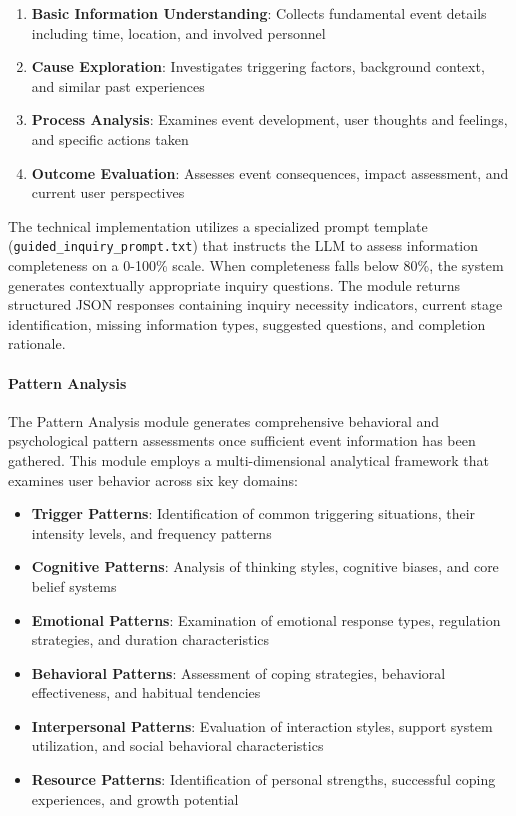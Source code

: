 \begin{enumerate}
\item \textbf{Basic Information Understanding}: Collects fundamental event details including time, location, and involved personnel
\item \textbf{Cause Exploration}: Investigates triggering factors, background context, and similar past experiences
\item \textbf{Process Analysis}: Examines event development, user thoughts and feelings, and specific actions taken
\item \textbf{Outcome Evaluation}: Assesses event consequences, impact assessment, and current user perspectives
\end{enumerate}

The technical implementation utilizes a specialized prompt template (\texttt{guided\_inquiry\_prompt.txt}) that instructs the LLM to assess information completeness on a 0-100\% scale. When completeness falls below 80\%, the system generates contextually appropriate inquiry questions. The module returns structured JSON responses containing inquiry necessity indicators, current stage identification, missing information types, suggested questions, and completion rationale.

\paragraph{Pattern Analysis}

The Pattern Analysis module generates comprehensive behavioral and psychological pattern assessments once sufficient event information has been gathered. This module employs a multi-dimensional analytical framework that examines user behavior across six key domains:

\begin{itemize}
\item \textbf{Trigger Patterns}: Identification of common triggering situations, their intensity levels, and frequency patterns
\item \textbf{Cognitive Patterns}: Analysis of thinking styles, cognitive biases, and core belief systems
\item \textbf{Emotional Patterns}: Examination of emotional response types, regulation strategies, and duration characteristics
\item \textbf{Behavioral Patterns}: Assessment of coping strategies, behavioral effectiveness, and habitual tendencies
\item \textbf{Interpersonal Patterns}: Evaluation of interaction styles, support system utilization, and social behavioral characteristics
\item \textbf{Resource Patterns}: Identification of personal strengths, successful coping experiences, and growth potential
\end{itemize}

